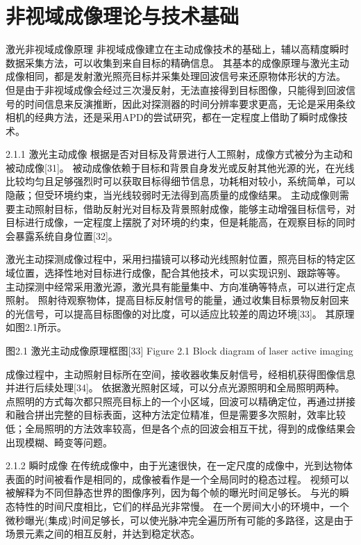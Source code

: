 \chapter{非视域成像理论与技术基础}\label{chap:Basis}

激光非视域成像原理
非视域成像建立在主动成像技术的基础上，辅以高精度瞬时数据采集方法，可以收集到来自目标的精确信息。
其基本的成像原理与激光主动成像相同，都是发射激光照亮目标并采集处理回波信号来还原物体形状的方法。
但是由于非视域成像会经过三次漫反射，无法直接得到目标图像，只能得到回波信号的时间信息来反演推断，因此对探测器的时间分辨率要求更高，无论是采用条纹相机的经典方法，还是采用APD的尝试研究，都在一定程度上借助了瞬时成像技术。

2.1.1  激光主动成像
根据是否对目标及背景进行人工照射，成像方式被分为主动和被动成像[31]。
被动成像依赖于目标和背景自身发光或反射其他光源的光，在光线比较均匀且足够强烈时可以获取目标得细节信息，功耗相对较小，系统简单，可以隐蔽；但受环境约束，当光线较弱时无法得到高质量的成像结果。
主动成像则需要主动照射目标，借助反射光对目标及背景照射成像，能够主动增强目标信号，对目标进行成像，一定程度上摆脱了对环境的约束，但是耗能高，在观察目标的同时会暴露系统自身位置[32]。
 
激光主动探测成像过程中，采用扫描镜可以移动光线照射位置，照亮目标的特定区域位置，选择性地对目标进行成像，配合其他技术，可以实现识别、跟踪等等。
主动探测中经常采用激光源，激光具有能量集中、方向准确等特点，可以进行定点照射。
照射待观察物体，提高目标反射信号的能量，通过收集目标景物反射回来的光信号，可以提高目标图像的对比度，可以适应比较差的周边环境[33]。
其原理如图2.1所示。

 
图2.1  激光主动成像原理框图[33]
Figure 2.1 Block diagram of laser active imaging

成像过程中，主动照射目标所在空间，接收器收集反射信号，经相机获得图像信息并进行后续处理[34]。
依据激光照射区域，可以分点光源照明和全局照明两种。
点照明的方式每次都只照亮目标上的一个小区域，回波可以精确定位，再通过拼接和融合拼出完整的目标表面，这种方法定位精准，但是需要多次照射，效率比较低；全局照明的方法效率较高，但是各个点的回波会相互干扰，得到的成像结果会出现模糊、畸变等问题。

2.1.2  瞬时成像
在传统成像中，由于光速很快，在一定尺度的成像中，光到达物体表面的时间被看作是相同的，成像被看作是一个全局同时的稳态过程。
视频可以被解释为不同但静态世界的图像序列，因为每个帧的曝光时间足够长。
与光的瞬态特性的时间尺度相比，它们的样品光非常慢。
在一个房间大小的环境中，一个微秒曝光(集成)时间足够长，可以使光脉冲完全遍历所有可能的多路径，这是由于场景元素之间的相互反射，并达到稳定状态。

